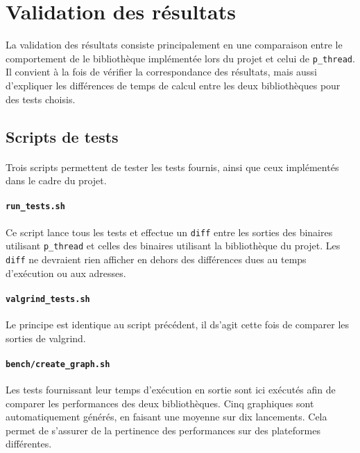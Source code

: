 \section{Validation des résultats}

La validation des résultats consiste principalement en une comparaison entre le comportement de le bibliothèque implémentée lors du projet et celui de \texttt{p\_thread}. Il convient à la fois de vérifier la correspondance des résultats, mais aussi d'expliquer les différences de temps de calcul entre les deux bibliothèques pour des tests choisis. 

\subsection{Scripts de tests}

\paragraph{}
Trois scripts permettent de tester les tests fournis, ainsi que ceux implémentés dans le cadre du projet. 

\paragraph{\texttt{run\_tests.sh}}
Ce script lance tous les tests et effectue un \texttt{diff} entre les sorties des binaires utilisant \texttt{p\_thread} et celles des binaires utilisant la bibliothèque du projet. Les \texttt{diff} ne devraient rien afficher en dehors des différences dues au temps d'exécution ou aux adresses.

\paragraph{\texttt{valgrind\_tests.sh}}
Le principe est identique au script précédent, il ds'agit cette fois de comparer les sorties de valgrind.

\paragraph{\texttt{bench/create\_graph.sh}}
Les tests fournissant leur temps d'exécution en sortie sont ici exécutés afin de comparer les performances des deux bibliothèques. Cinq graphiques sont automatiquement générés, en faisant une moyenne sur dix lancements. Cela permet de s'assurer de la pertinence des performances sur des plateformes différentes.

